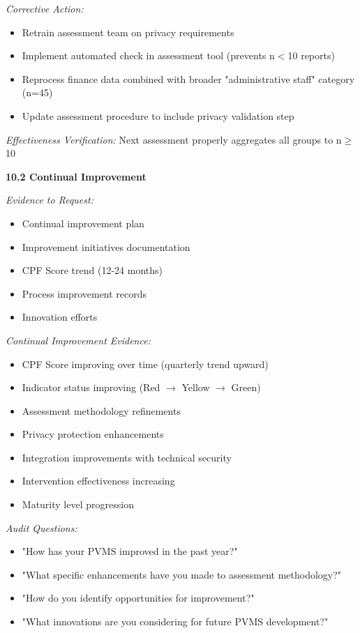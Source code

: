 \documentclass[11pt,a4paper]{article}
\begin{document}
\textit{Corrective Action:}
\begin{itemize}
\item Retrain assessment team on privacy requirements
\item Implement automated check in assessment tool (prevents n$<$10 reports)
\item Reprocess finance data combined with broader "administrative staff" category (n=45)
\item Update assessment procedure to include privacy validation step
\end{itemize}

\textit{Effectiveness Verification:} Next assessment properly aggregates all groups to n$\geq$10 \checkmark

\textbf{10.2 Continual Improvement}

\textit{Evidence to Request:}
\begin{itemize}
\item Continual improvement plan
\item Improvement initiatives documentation
\item CPF Score trend (12-24 months)
\item Process improvement records
\item Innovation efforts
\end{itemize}

\textit{Continual Improvement Evidence:}

\begin{itemize}
\item CPF Score improving over time (quarterly trend upward)
\item Indicator status improving (Red $\rightarrow$ Yellow $\rightarrow$ Green)
\item Assessment methodology refinements
\item Privacy protection enhancements
\item Integration improvements with technical security
\item Intervention effectiveness increasing
\item Maturity level progression
\end{itemize}

\textit{Audit Questions:}
\begin{itemize}
\item "How has your PVMS improved in the past year?"
\item "What specific enhancements have you made to assessment methodology?"
\item "How do you identify opportunities for improvement?"
\item "What innovations are you considering for future PVMS development?"
\end{itemize}
\end{document}
